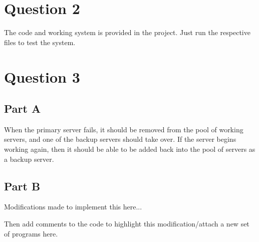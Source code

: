 \documentclass[12pt,fleqn,leqno,letterpaper]{article}
\begin{document}
\section*{Question 2}
The code and working system is provided in the project. Just run the respective files to test the system.

\section*{Question 3}
\subsection*{Part A}
When the primary server fails, it should be removed from the pool of working servers, and one of the backup servers should take over. If the server begins working again, then it should be able to be added back into the pool of servers as a backup server. 

\subsection*{Part B}
Modifications made to implement this here...


Then add comments to the code to highlight this modification/attach a new set of programs here.
\end{document}
